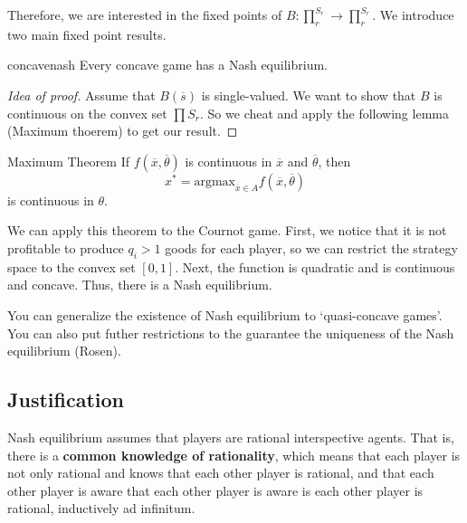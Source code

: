 Therefore, we are interested in the fixed points of $B:\prod_{r}^{S_r} \to \prod_{r}^{S_r} $. We introduce two main fixed point results.

\begin{atheorem}{}{concavenash}
    Every concave game has a Nash equilibrium.
\end{atheorem}
\begin{proof}[Idea of proof]
    Assume that $B(\overline{s})$ is single-valued. We want to show that $B$ is continuous on the convex set $\prod S_r$.
    So we cheat and apply the following lemma (Maximum thoerem) to get our result.
\end{proof}
\begin{alemma}{Maximum Theorem}{}
    If $f(\overline{x},\overline{\theta})$ is continuous in $\overline{x} $ and $\overline{\theta}$, then \[
    x^* = \textrm{argmax}_{\overline{x}\in A} f(\overline{x},\overline{\theta})
    \]
    is continuous in $\theta$.
\end{alemma}
We can apply this theorem to the Cournot game. First, we notice that it is not profitable to produce $q_i>1$ goods for each player, so we can restrict the strategy space to the convex set $[0,1]$. Next, the function is quadratic and is continuous and concave. Thus, there is a Nash equilibrium.
\begin{remark}
    You can generalize the existence of Nash equilibrium to `quasi-concave games'. You can also put futher restrictions to the guarantee the uniqueness of the Nash equilibrium (Rosen).
\end{remark}


\subsection*{Justification}
Nash equilibrium assumes that players are rational interspective agents. That is, there is a \textbf{common knowledge of rationality}, which means that each player is not only rational and knows that each other player is rational, and that each other player is aware that each other player is aware is each other player is rational, inductively ad infinitum.

